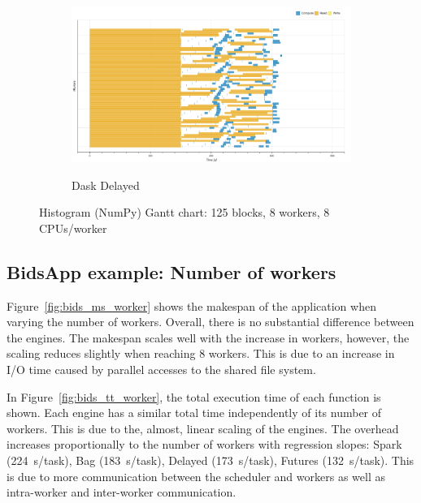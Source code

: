 \documentclass[conference]{IEEEtran}
\begin{document}
\begin{figure}[!tb]
\begin{subfigure}[b]{\columnwidth}
    \end{subfigure}
    \\
    \begin{subfigure}[b]{\columnwidth}
        \href{https://mathdugre.github.io/paper-big-data-engines/dask-delayed-histo_np-baseline.html}{
        \includegraphics[clip,width=\columnwidth,
        height=0.15\textheight]{images/delayed_histo_np_gantt.png}}
        \caption{Dask Delayed}\label{fig:histo_np_dask_delayed_gantt}
    \end{subfigure}
    \caption{Histogram (NumPy) Gantt chart: 125 blocks, 8 workers, 8
    CPUs/worker}\label{fig:histo_np_gantt}
\end{figure}

\subsection{BidsApp example: Number of workers}
Figure~\ref{fig:bids_ms_worker} shows the makespan of the application when
varying the number of workers. Overall, there is no substantial difference
between the engines. The makespan scales well with the increase in workers,
however, the scaling reduces slightly when reaching 8 workers. This is due
to an increase in I/O time caused by parallel accesses to 
the shared file system.

In Figure~\ref{fig:bids_tt_worker}, the total execution time of each function is
shown. Each engine has a similar total time independently of its number of workers.
This is due to the, almost, linear scaling of the engines. The overhead increases
proportionally to the number of workers with regression slopes: Spark
(\SI{224}{\second/task}), Bag (\SI{183}{\second/task}), Delayed
(\SI{173}{\second/task}), Futures (\SI{132}{\second/task}). This is due to more
communication between the scheduler and workers as well as intra-worker and
inter-worker communication.
\end{document}
